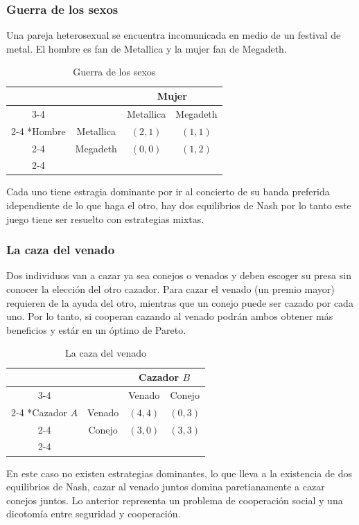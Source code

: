 
\subsubsection*{Guerra de los sexos}

Una pareja heterosexual se encuentra incomunicada en medio de un festival de metal. El hombre es fan de Metallica y la mujer fan de Megadeth. 

\begin{table}[!htbp]
    \centering
    \caption{Guerra de los sexos}
    \setlength{\extrarowheight}{2pt}
    \begin{tabular}{*{4}{c|}}
      \multicolumn{2}{c}{} & \multicolumn{2}{c}{Mujer}\\\cline{3-4}
      \multicolumn{1}{c}{} &  & Metallica  & Megadeth \\\cline{2-4}
      \multirow{2}*{Hombre}  & Metallica & $(2,1)$ & $(1,1)$ \\\cline{2-4}
      & Megadeth & $(0,0)$ & $(1,2)$ \\\cline{2-4}
    \end{tabular}
  \end{table}

  Cada uno tiene estragia dominante por ir al concierto de su banda preferida idependiente de lo que haga el otro, hay dos equilibrios de Nash por lo tanto este juego tiene ser resuelto con estrategias mixtas.

\subsubsection*{La caza del venado}
Dos individuos van a cazar ya sea conejos o venados y deben escoger su presa sin conocer la elección del otro cazador. Para cazar el venado (un premio mayor) requieren de la ayuda del otro, mientras que un conejo puede ser cazado por cada uno. Por lo tanto, si cooperan cazando al venado podrán ambos obtener más beneficios y estár en un óptimo de Pareto.

\begin{table}[!htbp]
    \centering
    \caption{La caza del venado}
    \setlength{\extrarowheight}{2pt}
    \begin{tabular}{*{4}{c|}}
      \multicolumn{2}{c}{} & \multicolumn{2}{c}{Cazador $B$}\\\cline{3-4}
      \multicolumn{1}{c}{} &  & Venado  & Conejo \\\cline{2-4}
      \multirow{2}*{Cazador $A$}  & Venado & $(4,4)$ & $(0,3)$ \\\cline{2-4}
      & Conejo & $(3,0)$ & $(3,3)$ \\\cline{2-4}
    \end{tabular}
  \end{table}
En este caso no existen estrategias dominantes, lo que lleva a la existencia de dos equilibrios de Nash, cazar al venado juntos domina paretianamente a cazar conejos juntos. Lo anterior representa un problema de cooperación social y una dicotomía entre seguridad y cooperación. 
